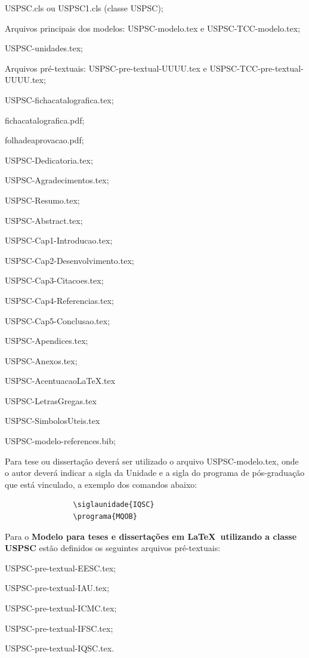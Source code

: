 \begin{alineas}	 
	\item USPSC.cls ou USPSC1.cls (classe USPSC); 
	\item Arquivos principais dos modelos: USPSC-modelo.tex  e  USPSC-TCC-modelo.tex;
	\item USPSC-unidades.tex;
	\item Arquivos pré-textuais: USPSC-pre-textual-UUUU.tex e USPSC-TCC-pre-textual-UUUU.tex;
	\item USPSC-fichacatalografica.tex;
	\item fichacatalografica.pdf;
	\item folhadeaprovacao.pdf;
	\item USPSC-Dedicatoria.tex;
	\item USPSC-Agradecimentos.tex;
	\item USPSC-Resumo.tex;
	\item USPSC-Abstract.tex;
	\item USPSC-Cap1-Introducao.tex;
	\item USPSC-Cap2-Desenvolvimento.tex;
	\item USPSC-Cap3-Citacoes.tex;
	\item USPSC-Cap4-Referencias.tex;
	\item USPSC-Cap5-Conclusao.tex;
	\item USPSC-Apendices.tex;
	\item USPSC-Anexos.tex;
	\item USPSC-AcentuacaoLaTeX.tex
	\item USPSC-LetrasGregas.tex
	\item USPSC-SimbolosUteis.tex
	\item USPSC-modelo-references.bib;
	
\end{alineas}	 

		
Para tese ou dissertação deverá ser utilizado o arquivo USPSC-modelo.tex, onde o autor deverá indicar a sigla da Unidade e a sigla do programa de pós-graduação que está vinculado, a exemplo dos comandos abaixo:
		
			\begin{verbatim}
				\siglaunidade{IQSC}
				\programa{MQOB}
			\end{verbatim}
			
Para o \textbf{Modelo para teses e dissertações em \LaTeX\ utilizando a classe USPSC} estão definidos os seguintes arquivos pré-textuais:
			
			\begin{alineas}	 
				\item USPSC-pre-textual-EESC.tex;
				\item USPSC-pre-textual-IAU.tex;
				\item USPSC-pre-textual-ICMC.tex;
				\item USPSC-pre-textual-IFSC.tex;
				\item USPSC-pre-textual-IQSC.tex.
			\end{alineas}
			
